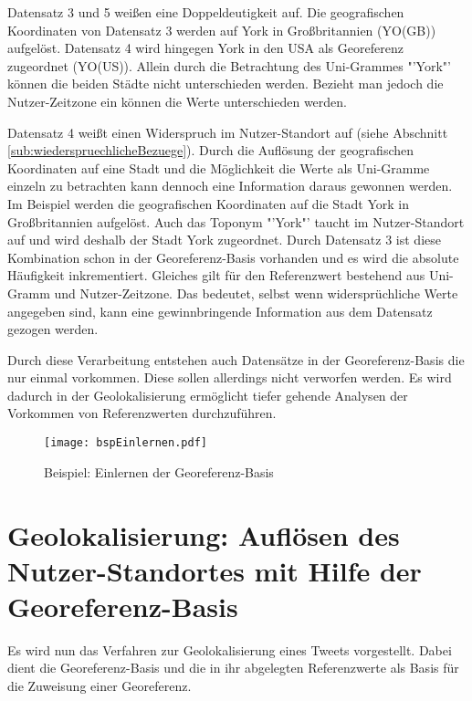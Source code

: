 			Datensatz 3 und 5 weißen eine Doppeldeutigkeit auf.
			Die geografischen Koordinaten von Datensatz 3 werden auf York in Großbritannien (YO(GB)) aufgelöst.
			Datensatz 4 wird hingegen York in den USA als Georeferenz zugeordnet (YO(US)). 
			Allein durch die Betrachtung des Uni-Grammes "'York"' können die beiden Städte nicht unterschieden werden. 
			Bezieht man jedoch die Nutzer-Zeitzone ein können die Werte unterschieden werden. 

			Datensatz 4 weißt einen Widerspruch im Nutzer-Standort auf (siehe Abschnitt \ref{sub:wiederspruechlicheBezuege}). 
			Durch die Auflösung der geografischen Koordinaten auf eine Stadt und die Möglichkeit die Werte als Uni-Gramme einzeln zu betrachten kann dennoch eine Information daraus gewonnen werden. 
			Im Beispiel werden die geografischen Koordinaten auf die Stadt York in Großbritannien aufgelöst.
			Auch das Toponym "'York"' taucht im Nutzer-Standort auf und wird deshalb der Stadt York zugeordnet.  
			Durch Datensatz 3 ist diese Kombination schon in der Georeferenz-Basis vorhanden und es wird die absolute Häufigkeit inkrementiert.
			Gleiches gilt für den Referenzwert bestehend aus Uni-Gramm und Nutzer-Zeitzone.
			Das bedeutet, selbst wenn widersprüchliche Werte angegeben sind, kann eine gewinnbringende Information aus dem Datensatz gezogen werden.

			Durch diese Verarbeitung entstehen auch Datensätze in der Georeferenz-Basis die nur einmal vorkommen.
			Diese sollen allerdings nicht verworfen werden. 
			Es wird dadurch in der Geolokalisierung ermöglicht tiefer gehende Analysen der Vorkommen von Referenzwerten durchzuführen. 

			\begin{figure}[h!]
				\begin{center}
				\texttt{[image: bspEinlernen.pdf]}
				\caption{Beispiel: Einlernen der Georeferenz-Basis}
				\label{img:bspEinlernen}
				\end{center}
			\end{figure}	
				

	\section{Geolokalisierung: Auflösen des Nutzer-Standortes mit Hilfe der Georeferenz-Basis} \label{sec:AufloesenDesNutzerStandortes} 

		Es wird nun das Verfahren zur Geolokalisierung eines Tweets vorgestellt.
		Dabei dient die Georeferenz-Basis und die in ihr abgelegten Referenzwerte als Basis für die Zuweisung einer Georeferenz.

